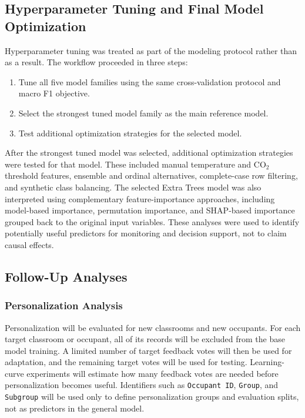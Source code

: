 ﻿\documentclass[11pt]{article}
\newcommand{\Reviewed}[1]{\begingroup\color{black}#1\endgroup}
\begin{document}
\Reviewed{
\subsection{Hyperparameter Tuning and Final Model Optimization}

Hyperparameter tuning was treated as part of the modeling protocol rather than as a result. The workflow proceeded in three steps:
\begin{enumerate}
    \item Tune all five model families using the same cross-validation protocol and macro F1 objective.
    \item Select the strongest tuned model family as the main reference model.
    \item Test additional optimization strategies for the selected model.
\end{enumerate}}

\Reviewed{After the strongest tuned model was selected, additional optimization strategies were tested for that model. These included manual temperature and CO$_2$ threshold features, ensemble and ordinal alternatives, complete-case row filtering, and synthetic class balancing. The selected Extra Trees model was also interpreted using complementary feature-importance approaches, including model-based importance, permutation importance, and SHAP-based importance grouped back to the original input variables. These analyses were used to identify potentially useful predictors for monitoring and decision support, not to claim causal effects.}
\Reviewed{
\subsection{Follow-Up Analyses}

\subsubsection{Personalization Analysis}

Personalization will be evaluated for new classrooms and new occupants. For each target classroom or occupant, all of its records will be excluded from the base model training. A limited number of target feedback votes will then be used for adaptation, and the remaining target votes will be used for testing. Learning-curve experiments will estimate how many feedback votes are needed before personalization becomes useful. Identifiers such as \texttt{Occupant ID}, \texttt{Group}, and \texttt{Subgroup} will be used only to define personalization groups and evaluation splits, not as predictors in the general model.}
\end{document}
